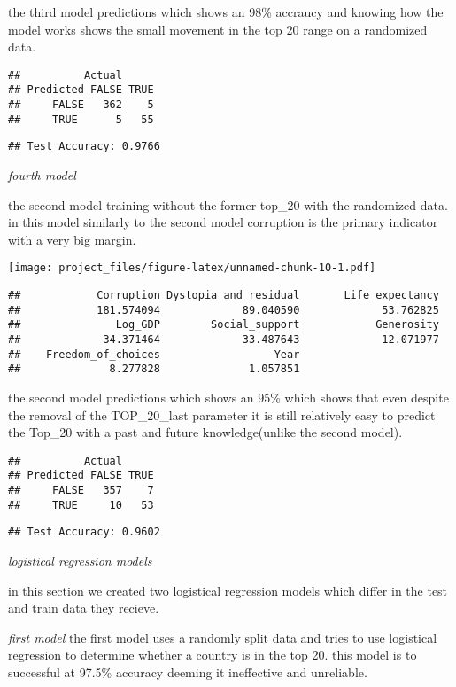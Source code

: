 \documentclass[
]{article}
\begin{document}
the third model predictions which shows an 98\% accraucy and knowing how
the model works shows the small movement in the top 20 range on a
randomized data.

\begin{verbatim}
##          Actual
## Predicted FALSE TRUE
##     FALSE   362    5
##     TRUE      5   55
\end{verbatim}

\begin{verbatim}
## Test Accuracy: 0.9766
\end{verbatim}

\emph{fourth model}

the second model training without the former top\_20 with the randomized
data. in this model similarly to the second model corruption is the
primary indicator with a very big margin.

\texttt{[image: project\_files/figure-latex/unnamed-chunk-10-1.pdf]}

\begin{verbatim}
##            Corruption Dystopia_and_residual       Life_expectancy 
##            181.574094             89.040590             53.762825 
##               Log_GDP        Social_support            Generosity 
##             34.371464             33.487643             12.071977 
##    Freedom_of_choices                  Year 
##              8.277828              1.057851
\end{verbatim}

the second model predictions which shows an 95\% which shows that even
despite the removal of the TOP\_20\_last parameter it is still
relatively easy to predict the Top\_20 with a past and future
knowledge(unlike the second model).

\begin{verbatim}
##          Actual
## Predicted FALSE TRUE
##     FALSE   357    7
##     TRUE     10   53
\end{verbatim}

\begin{verbatim}
## Test Accuracy: 0.9602
\end{verbatim}

\emph{logistical regression models}

in this section we created two logistical regression models which differ
in the test and train data they recieve.

\emph{first model} the first model uses a randomly split data and tries
to use logistical regression to determine whether a country is in the
top 20. this model is to successful at 97.5\% accuracy deeming it
ineffective and unreliable.
\end{document}
